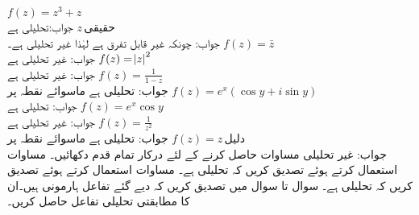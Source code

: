 \quad
$f(z)=z^3+z$\\
جواب:\quad تحلیلی ہے
\quad
$z\,\text{حقیقی}$\\
جواب:\quad
چونکہ غیر قابل تفرق ہے لہٰذا غیر تحلیلی ہے۔
\quad
$f(z)=\bar{z}$\\
جواب:\quad
غیر تحلیلی ہے
\quad
$f(z)=\abs{z}^2$\\
جواب:\quad
غیر تحلیلی ہے
\quad
$f(z)=\tfrac{1}{1-z}$\\
جواب:\quad
تحلیلی ہے ماسوائے نقطہ  پر
\quad
$f(z)=e^x(\cos y+i\sin y)$\\
جواب:\quad
تحلیلی ہے
\quad
$f(z)=e^x\cos y$\\
جواب:\quad
غیر تحلیلی ہے
\quad
$f(z)=\tfrac{1}{z^2}$\\
جواب:\quad
تحلیلی ہے ماسوائے نقطہ  پر
\quad
$f(z)=z\,\text{دلیل}$\\
جواب:\quad
غیر تحلیلی
\quad
مساوات  حاصل کرنے کے لئے درکار تمام قدم دکھائیں۔
\quad
مساوات  استعمال کرتے ہوئے تصدیق کریں کہ  تحلیلی ہے۔
\quad
مساوات  استعمال کرتے ہوئے تصدیق کریں کہ  تحلیلی ہے۔
سوال  تا سوال  میں تصدیق کریں کہ دیے گئے تفاعل ہارمونی ہیں۔ان کا مطابقتی تحلیلی تفاعل  حاصل کریں۔

